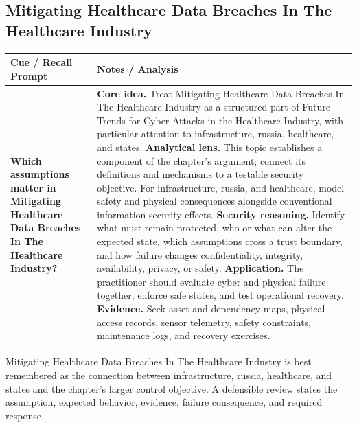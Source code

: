 \documentclass[11pt]{article}
\newcommand{\CornellHeader}{%
\rowcolor{Navy}\color{white}\bfseries Cue / Recall Prompt & \color{white}\bfseries Notes / Analysis\\\hline}
\newcommand{\CornellRow}[2]{%
\cellcolor{CueGray}\RaggedRight\textbf{#1} & \RaggedRight #2\\\hline}
\begin{document}
\subsection*{Mitigating Healthcare Data Breaches In The Healthcare Industry}
\begin{longtable}{>{\RaggedRight\arraybackslash}p{}|>{\RaggedRight\arraybackslash}p{}}
\CornellHeader
\CornellRow{Which assumptions matter in Mitigating Healthcare Data Breaches In The Healthcare Industry?}{\textbf{Core idea.} Treat Mitigating Healthcare Data Breaches In The Healthcare Industry as a structured part of Future Trends for Cyber Attacks in the Healthcare Industry, with particular attention to infrastructure, russia, healthcare, and states. \textbf{Analytical lens.} This topic establishes a component of the chapter's argument; connect its definitions and mechanisms to a testable security objective. For infrastructure, russia, and healthcare, model safety and physical consequences alongside conventional information-security effects. \textbf{Security reasoning.} Identify what must remain protected, who or what can alter the expected state, which assumptions cross a trust boundary, and how failure changes confidentiality, integrity, availability, privacy, or safety. \textbf{Application.} The practitioner should evaluate cyber and physical failure together, enforce safe states, and test operational recovery. \textbf{Evidence.} Seek asset and dependency maps, physical-access records, sensor telemetry, safety constraints, maintenance logs, and recovery exercises.}
\end{longtable}
\begin{topicsummary}
Mitigating Healthcare Data Breaches In The Healthcare Industry is best remembered as the connection between infrastructure, russia, healthcare, and states and the chapter's larger control objective. A defensible review states the assumption, expected behavior, evidence, failure consequence, and required response.
\end{topicsummary}
\end{document}
